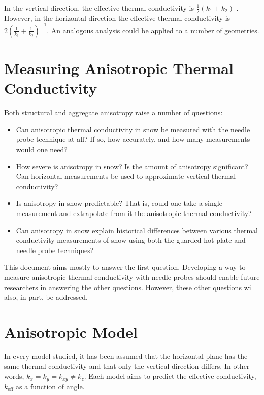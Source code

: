 In the vertical direction, the effective thermal conductivity is
\(\frac12(k_1 + k_2)\) \cite{lunardini}. However, in the horizontal direction the effective
thermal conductivity is \(2\left( \frac1{k_1} + \frac1{k_2} \right)^{-1}\). An analogous analysis could be applied to a number of geometries.


\section{Measuring Anisotropic Thermal Conductivity}

Both structural and aggregate anisotropy raise a number of questions:

\begin{itemize}
\item Can anisotropic thermal conductivity in snow be measured with the needle
probe technique at all? If so, how accurately, and how many measurements would
one need?
\item How severe is anisotropy in snow? Is the amount of anisotropy
significant? Can horizontal measurements be used to approximate vertical thermal
conductivity?
\item Is anisotropy in snow predictable? That is, could one take a single
measurement and extrapolate from it the anisotropic thermal conductivity?
\item Can anisotropy in snow explain historical differences between various
thermal conductivity measurements of snow using both the guarded hot plate and
needle probe techniques?
\end{itemize}



This document aims mostly to answer the first question. Developing a way
to measure anisotropic thermal conductivity with needle probes should enable
future researchers in answering the other questions. However, these other
questions will also, in part, be addressed.

\section{Anisotropic Model}


In every model studied, it has been assumed that the horizontal plane has the
same thermal conductivity and that only the vertical direction differs. In other
words, \(k_x = k_y = k_{xy} \ne k_z\). Each model aims to predict the effective
conductivity, \(k_{\textrm{eff}}\) as a function of angle.


